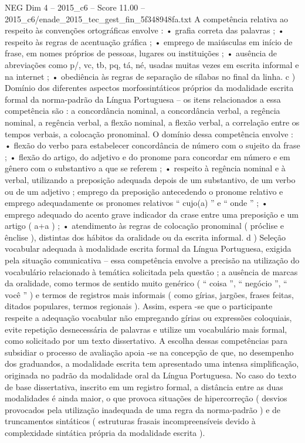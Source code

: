 \begin{textsample}{NEG Dim 4 – 2015\_c6 – Score 11.00 – 2015\_c6/enade\_2015\_tec\_gest\_fin\_5f348948fa.txt}
A competência relativa ao respeito às convenções ortográficas envolve : • grafia correta das palavras ; • respeito às regras de acentuação gráfica ; • emprego de maiúsculas em início de frase, em nomes próprios de pessoas, lugares ou instituições ; • ausência de abreviações como p/, vc, tb, pq, tá, né, usadas muitas vezes em escrita informal e na internet ; • obediência às regras de separação de sílabas no final da linha. c ) Domínio dos diferentes aspectos morfossintáticos próprios da modalidade escrita formal da norma-padrão da Língua Portuguesa – os itens relacionados a essa competência são : a concordância nominal, a concordância verbal, a regência nominal, a regência verbal, a flexão nominal, a flexão verbal, a correlação entre os tempos verbais, a colocação pronominal.
O domínio dessa competência envolve : • flexão do verbo para estabelecer concordância de número com o sujeito da frase ; • flexão do artigo, do adjetivo e do pronome para concordar em número e em gênero com o substantivo a que se referem ; • respeito à regência nominal e à verbal, utilizando a preposição adequada depois de um substantivo, de um verbo ou de um adjetivo ; emprego da preposição antecedendo o pronome relativo e emprego adequadamente os pronomes relativos “ cujo(a) ” e “ onde ” ; • emprego adequado do acento grave indicador da crase entre uma preposição e um artigo ( a+a ) ; • atendimento às regras de colocação pronominal ( próclise e ênclise ), distintas dos hábitos da oralidade ou da escrita informal. d ) Seleção vocabular adequada à modalidade escrita formal da Língua Portuguesa, exigida pela situação comunicativa – essa competência envolve a precisão na utilização do vocabulário relacionado à temática solicitada pela questão ; a ausência de marcas da oralidade, como termos de sentido muito genérico ( “ coisa ”, “ negócio ”, “ você ” ) e termos de registros mais informais ( como gírias, jargões, frases feitas, ditados populares, termos regionais ).
Assim, espera -se que o participante respeite a adequação vocabular não empregando gírias ou expressões coloquiais, evite repetição desnecessária de palavras e utilize um vocabulário mais formal, como solicitado por um texto dissertativo.
A escolha dessas competências para subsidiar o processo de avaliação apoia -se na concepção de que, no desempenho dos graduandos, a modalidade escrita tem apresentado uma intensa simplificação, originada no padrão da modalidade oral da Língua Portuguesa.
No caso do texto de base dissertativa, inscrito em um registro formal, a distância entre as duas modalidades é ainda maior, o que provoca situações de hipercorreção ( desvios provocados pela utilização inadequada de uma regra da norma-padrão ) e de truncamentos sintáticos ( estruturas frasais incompreensíveis devido à complexidade sintática própria da modalidade escrita ).

\end{textsample}
